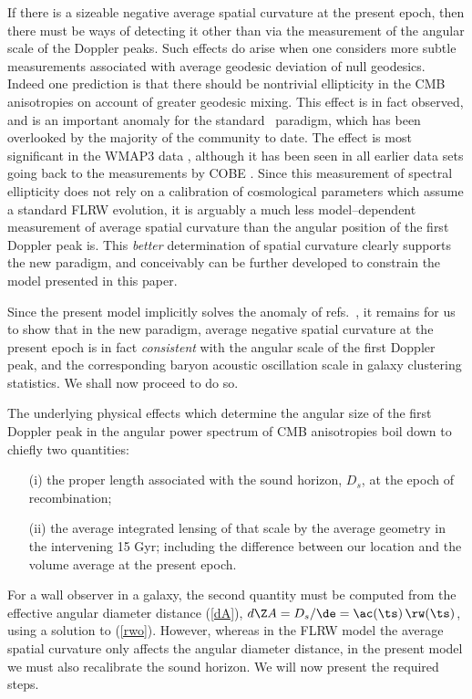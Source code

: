 \documentclass[12pt]{iopart}
\begin{document}
If there is a sizeable negative average spatial curvature at
the present epoch, then there must be ways of detecting it other than
via the measurement of the angular scale of the Doppler peaks.
Such effects do arise when one considers more subtle measurements associated
with average geodesic deviation of null geodesics.
Indeed one prediction is that there should be nontrivial ellipticity
in the CMB anisotropies on account of greater geodesic mixing.
This effect is in fact observed, and is an important anomaly for the
standard \LCDM\ paradigm, which has been overlooked by the majority of the
community to date. The effect is most significant in the WMAP3 data
\cite{elliptic2}, although it has been seen in all earlier data sets going
back to the measurements by COBE \cite{elliptic1}. Since this measurement
of spectral ellipticity does not rely
on a calibration of cosmological parameters which assume a standard
FLRW evolution, it is arguably a much less model--dependent measurement
of average spatial curvature than the angular position of the first
Doppler peak is. This {\em better} determination of spatial curvature clearly
supports the new paradigm, and conceivably can be further developed
to constrain the model presented in this paper.

Since the present model implicitly solves the anomaly of refs.\
\cite{elliptic2,elliptic1}, it remains for us to show that in the new
paradigm, average negative spatial curvature at the present epoch
is in fact {\em consistent} with the angular scale of the first Doppler
peak, and the corresponding baryon acoustic oscillation scale in
galaxy clustering statistics. We shall now proceed to do so.

The underlying physical effects which determine the angular size of
the first Doppler peak in the angular power spectrum of CMB anisotropies
boil down to chiefly two quantities:
\begin{itemize}
\item[(i)] the proper length associated
with the sound horizon, $D_s$, at the epoch of recombination;
\item[(ii)] the average
integrated lensing of that scale by the average geometry in the intervening
15 Gyr; including the difference between our location and the volume
average at the present epoch.
\end{itemize}
For a wall observer in a galaxy, the second quantity must be computed from
the effective angular diameter distance (\ref{dA}), $d\Z A=D_s/\de=\ac(\ts)
\,\rw(\ts)$, using a solution to (\ref{rwo}). However, whereas
in the FLRW model the average spatial curvature only affects the angular
diameter distance, in the present model we must also recalibrate the sound
horizon. We will now present the required steps.
\end{document}

